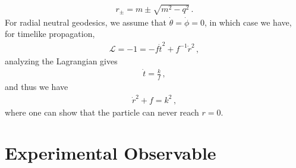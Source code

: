 \documentclass[11pt, onesided]{book}
\theoremstyle{break}
\theoremstyle{break}
\begin{document}
\begin{align*}
r_{\pm} = m \pm \sqrt{m^2 - q^2}\,.
\end{align*}
For radial neutral geodesics, we assume that $\dot{\theta} = \dot{\phi} = 0$, in which case we have, for timelike propagation, 
\begin{align*}
\mathcal{L} = -1 = -f\dot{t}^2 +f^{-1} \dot{r}^2\,, 
\end{align*}
analyzing the Lagrangian gives
\begin{align*}
\dot{t} = \frac{k}{f}\,,
\end{align*}
and thus we have
\begin{align*}
\dot{r}^2 + f = k^2\,,
\end{align*}
where one can show that the particle can never reach $r=0$. 




\chapter{Experimental Observable}
\end{document}
